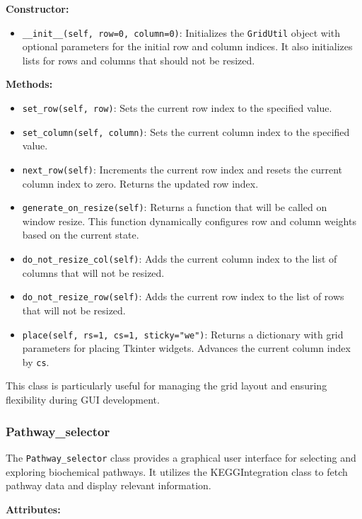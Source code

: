 \textbf{Constructor:}

\begin{itemize}
\item \texttt{\_\_init\_\_(self, row=0, column=0)}: Initializes the \texttt{GridUtil} object with optional parameters for the initial row and column indices. It also initializes lists for rows and columns that should not be resized.
\end{itemize}

\textbf{Methods:}

\begin{itemize}
\item \texttt{set\_row(self, row)}: Sets the current row index to the specified value.
\item \texttt{set\_column(self, column)}: Sets the current column index to the specified value.
\item \texttt{next\_row(self)}: Increments the current row index and resets the current column index to zero. Returns the updated row index.
\item \texttt{generate\_on\_resize(self)}: Returns a function that will be called on window resize. This function dynamically configures row and column weights based on the current state.
\item \texttt{do\_not\_resize\_col(self)}: Adds the current column index to the list of columns that will not be resized.
\item \texttt{do\_not\_resize\_row(self)}: Adds the current row index to the list of rows that will not be resized.
\item \texttt{place(self, rs=1, cs=1, sticky="we")}: Returns a dictionary with grid parameters for placing Tkinter widgets. Advances the current column index by \texttt{cs}.
\end{itemize}

This class is particularly useful for managing the grid layout and ensuring flexibility during GUI development.

\subsubsection{Pathway\_selector}

The \texttt{Pathway\_selector} class provides a graphical user interface for selecting and exploring biochemical pathways. It utilizes the KEGGIntegration class to fetch pathway data and display relevant information.

\textbf{Attributes:}

